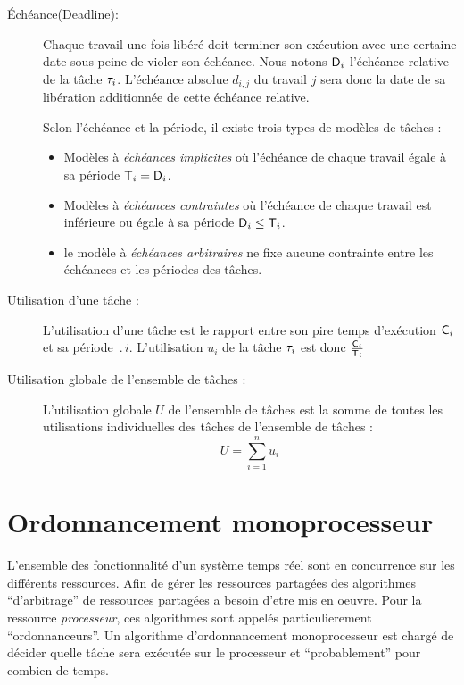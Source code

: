 \begin{description}
\item[Échéance(Deadline):] Chaque travail une fois libéré doit
  terminer son exécution avec une certaine date sous peine de violer
  son échéance. Nous notons $\mathsf{D}_{i}$ l’échéance relative de la
  tâche $\tau_{i}$. L’échéance absolue $d_{i,j}$ du travail $j$ sera
  donc la date de sa libération additionnée de cette échéance
  relative.

Selon l'échéance et la période, il existe trois types de modèles de
t\^aches :

\begin{itemize}
\item Modèles à \emph{échéances implicites} où l’échéance de
  chaque travail égale à sa période $\mathsf{T}_{i} = \mathsf{D}_{i}$.
\item Modèles à \emph{échéances contraintes} où l’échéance de chaque
  travail est inférieure ou égale à sa période $\mathsf{D}_{i} \leq
  \mathsf{T}_{i}$.
\item le modèle à \emph{échéances arbitraires} ne fixe aucune
  contrainte entre les échéances et les périodes des tâches.
\end{itemize}


\item[Utilisation d’une tâche :] L’utilisation d’une tâche est le
  rapport entre son pire temps d'exécution $\mathsf{C}_{i}$ et sa période
  $\period{i}$. L’utilisation $u_i$ de la t\^ache $\tau_{i}$ est donc
  $\frac{\mathsf{C}_{i}}{\mathsf{T}_{i}}$
\item[Utilisation globale de l’ensemble de tâches :] L’utilisation
  globale $U$ de l’ensemble de tâches est la somme de toutes les
  utilisations individuelles des tâches de l’ensemble de tâches :
\begin{equation}
U = \sum_{i=1}^n u_i
\end{equation}
\end{description}

\section{Ordonnancement monoprocesseur}
L'ensemble des fonctionnalité d'un système temps réel sont en
concurrence sur les différents ressources. Afin de gérer les
ressources partagées des algorithmes ``d'arbitrage'' de ressources
partagées a besoin d'etre mis en oeuvre. Pour la ressource
\emph{processeur}, ces algorithmes sont appelés particulierement
``ordonnanceurs''. Un algorithme d’ordonnancement monoprocesseur est
chargé de décider quelle tâche sera exécutée sur le processeur et
``probablement'' pour combien de temps. 
